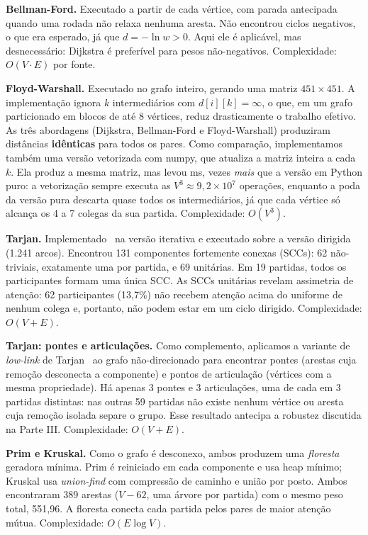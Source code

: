 \documentclass[sigconf]{webmedia}
\begin{document}
\textbf{Bellman-Ford.} Executado a partir de cada vértice, com parada antecipada quando uma rodada não relaxa nenhuma aresta. Não encontrou ciclos negativos, o que era esperado, já que $d = -\ln w > 0$. Aqui ele é aplicável, mas desnecessário: Dijkstra é preferível para pesos não-negativos. Complexidade: $O(V \cdot E)$ por fonte.

\textbf{Floyd-Warshall.} Executado no grafo inteiro, gerando uma matriz $451 \times 451$. A implementação ignora $k$ intermediários com $d[i][k] = \infty$, o que, em um grafo particionado em blocos de até 8 vértices, reduz drasticamente o trabalho efetivo. As três abordagens (Dijkstra, Bellman-Ford e Floyd-Warshall) produziram distâncias \textbf{idênticas} para todos os pares. Como comparação, implementamos também uma versão vetorizada com numpy, que atualiza a matriz inteira a cada $k$. Ela produz a mesma matriz, mas levou \tempoFWnumpy{} ms, \razaoFWnumpy{} vezes \emph{mais} que a versão em Python puro: a vetorização sempre executa as $V^3 \approx 9{,}2 \times 10^7$ operações, enquanto a poda da versão pura descarta quase todos os intermediários, já que cada vértice só alcança os 4 a 7 colegas da sua partida. Complexidade: $O(V^3)$.

\textbf{Tarjan.} Implementado~\cite{tarjan1972} na versão iterativa e executado sobre a versão dirigida (1.241 arcos). Encontrou 131 componentes fortemente conexas (SCCs): 62 não-triviais, exatamente uma por partida, e 69 unitárias. Em 19 partidas, todos os participantes formam uma única SCC. As SCCs unitárias revelam assimetria de atenção: 62 participantes (13,7\%) não recebem atenção acima do uniforme de nenhum colega e, portanto, não podem estar em um ciclo dirigido. Complexidade: $O(V+E)$.

\textbf{Tarjan: pontes e articulações.} Como complemento, aplicamos a variante de \textit{low-link} de Tarjan~\cite{tarjan1972} ao grafo não-direcionado para encontrar pontes (arestas cuja remoção desconecta a componente) e pontos de articulação (vértices com a mesma propriedade). Há apenas 3 pontes e 3 articulações, uma de cada em 3 partidas distintas: nas outras 59 partidas não existe nenhum vértice ou aresta cuja remoção isolada separe o grupo. Esse resultado antecipa a robustez discutida na Parte III. Complexidade: $O(V+E)$.

\textbf{Prim e Kruskal.} Como o grafo é desconexo, ambos produzem uma \emph{floresta} geradora mínima. Prim é reiniciado em cada componente e usa heap mínimo; Kruskal usa \textit{union-find} com compressão de caminho e união por posto. Ambos encontraram 389 arestas ($V - 62$, uma árvore por partida) com o mesmo peso total, 551,96. A floresta conecta cada partida pelos pares de maior atenção mútua. Complexidade: $O(E\log V)$.
\end{document}

